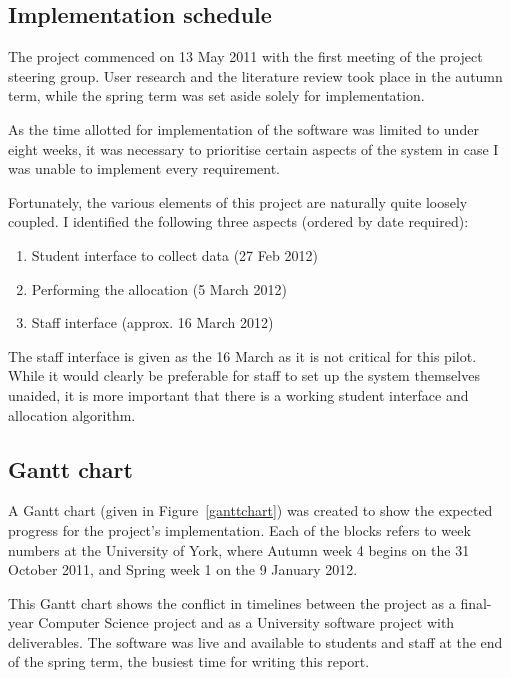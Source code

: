 
\subsection{Implementation schedule}

The project commenced on 13 May 2011 with the first meeting of the project
steering group. User research and the literature review took place in the
autumn term, while the spring term was set aside solely for implementation.

As the time allotted for implementation of the software was limited to under
eight weeks, it was necessary to prioritise certain aspects of the system in
case I was unable to implement every requirement.

Fortunately, the various elements of this project are naturally quite loosely
coupled. I identified the following three aspects (ordered by date required):

\begin{enumerate}
  \item Student interface to collect data (27 Feb 2012)
  \item Performing the allocation (5 March 2012)
  \item Staff interface (approx. 16 March 2012)
\end{enumerate}

The staff interface is given as the 16 March as it is not critical for this
pilot. While it would clearly be preferable for staff to set up the system
themselves unaided, it is more important that there is a working student
interface and allocation algorithm.

\subsection{Gantt chart}

A Gantt chart (given in Figure~\ref{ganttchart}) was created to show the
expected progress for the project's implementation. Each of the blocks refers
to week numbers at the University of York, where Autumn week 4 begins on the
31 October 2011, and Spring week 1 on the 9 January 2012.

This Gantt chart shows the conflict in timelines between the project as a
final-year Computer Science project and as a University software project with
deliverables. The software was live and available to students and staff at the
end of the spring term, the busiest time for writing this report.


